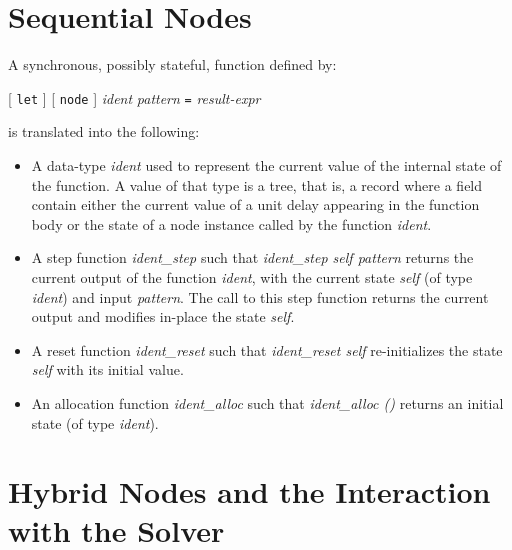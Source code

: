 \documentclass[11pt,titlepage,twoside]{report}
\newcommand{\term}[1]{{\tt #1}}
\newcommand{\nterm}[1]{{\em #1}}
\begin{document}
\section{Sequential Nodes}
A synchronous, possibly stateful, function defined by:
\begin{center}
  [ \term{let} ] [ \term{node} ] \nterm{ident} \nterm{pattern} \term{=}
  \nterm{result-expr}
\end{center}
is translated into the following:
\begin{itemize}
\item
  A data-type \nterm{ident} used to represent the current value of the
  internal state of the function. A value of that type is a tree, that
  is, a record where a field contain either the current value of a unit delay
  appearing in the function body or the
  state of a node instance called by the function \nterm{ident}.
\item
  A step function \nterm{ident\_step} such that
    \nterm{ident\_step self pattern} returns the current output of the function
    \nterm{ident}, with the current state \nterm{self} (of type
    \nterm{ident}) and input \nterm{pattern}. The call to this step
    function returns the current output and modifies in-place
    the state \nterm{self}.
  \item
    A reset function \nterm{ident\_reset} such that \nterm{ident\_reset self}
    re-initializes the state \nterm{self} with its initial value.
  \item
    An allocation function \nterm{ident\_alloc} such that \nterm{ident\_alloc ()}
    returns an initial state (of type \nterm{ident}).
\end{itemize}

\section{Hybrid Nodes and the Interaction with the Solver}
\end{document}
